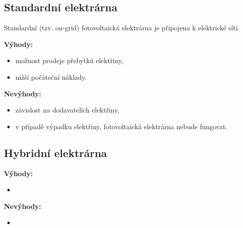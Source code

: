 \subsection{Standardní elektrárna}

Standardní (tzv. on-grid) fotovoltaická elektrárna je připojena k elektrické síti.

\begin{multicols}{2}
    \textbf{Výhody:}
    \begin{itemize}[leftmargin=*]
        \item možnost prodeje přebytků elektřiny,
        \item nižší počáteční náklady.
    \end{itemize}
    
    \columnbreak
    
    \textbf{Nevýhody:}
    \begin{itemize}[leftmargin=*]
        \item závislost na dodavatelích elektřiny,
        \item v případě výpadku elektřiny, fotovoltaická elektrárna nebude fungovat.
    \end{itemize}
\end{multicols}

\subsection{Hybridní elektrárna}

\begin{multicols}{2}
    \textbf{Výhody:}
    \begin{itemize}[leftmargin=*]
        \item
    \end{itemize}
    
    \columnbreak
    
    \textbf{Nevýhody:}
    \begin{itemize}[leftmargin=*]
        \item
    \end{itemize}
    
\end{multicols}
